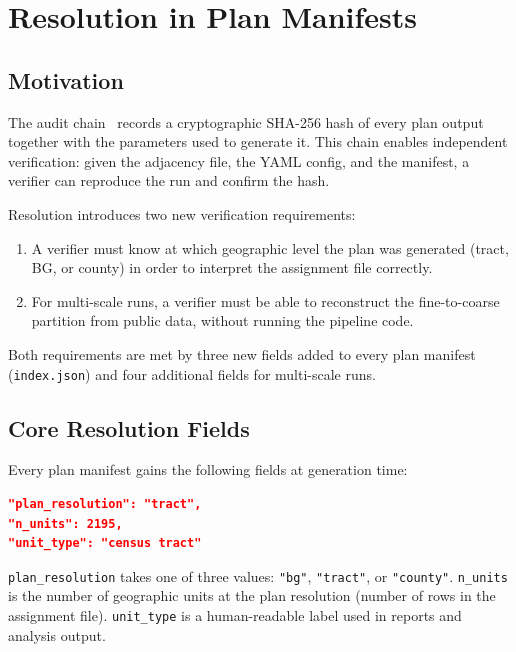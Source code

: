 \section{Resolution in Plan Manifests}
\label{sec:manifests}

\subsection{Motivation}

The \redist{} audit chain~\citep{dellaLibera2026b1} records a cryptographic
SHA-256 hash of every plan output together with the parameters used to
generate it.
This chain enables independent verification: given the adjacency file,
the YAML config, and the manifest, a verifier can reproduce the run and
confirm the hash.

Resolution introduces two new verification requirements:
\begin{enumerate}
  \item A verifier must know at which geographic level the plan was generated
        (tract, BG, or county) in order to interpret the assignment file
        correctly.
  \item For multi-scale runs, a verifier must be able to reconstruct the
        fine-to-coarse partition from public data, without running the
        pipeline code.
\end{enumerate}

Both requirements are met by three new fields added to every plan manifest
(\texttt{index.json}) and four additional fields for multi-scale runs.

\subsection{Core Resolution Fields}

Every plan manifest gains the following fields at generation time:

\begin{lstlisting}[language=json]
"plan_resolution": "tract",
"n_units": 2195,
"unit_type": "census tract"
\end{lstlisting}

\noindent
\texttt{plan\_resolution} takes one of three values: \texttt{"bg"},
\texttt{"tract"}, or \texttt{"county"}.
\texttt{n\_units} is the number of geographic units at the plan resolution
(number of rows in the assignment file).
\texttt{unit\_type} is a human-readable label used in reports and analysis
output.

